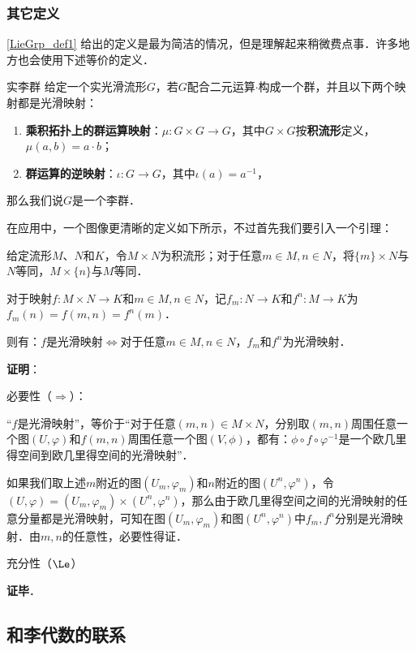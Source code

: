 \subsubsection{其它定义}

\autoref{LieGrp_def1} 给出的定义是最为简洁的情况，但是理解起来稍微费点事．许多地方也会使用下述等价的定义．

\begin{definition}{实李群}
给定一个实光滑流形$G$，若$G$配合二元运算$\cdot$构成一个群，并且以下两个映射都是光滑映射：
\begin{enumerate}
\item \textbf{乘积拓扑上的群运算映射}：$\mu:G\times G\to G$，其中$G\times G$按\textbf{积流形}定义，$\mu(a,b)=a\cdot b$；
\item \textbf{群运算的逆映射}：$\iota:G\to G$，其中$\iota(a)=a^{-1}$，
\end{enumerate}
那么我们说$G$是一个李群．
\end{definition}

在应用中，一个图像更清晰的定义如下所示，不过首先我们要引入一个引理：

\begin{lemma}{}
给定流形$M$、$N$和$K$，令$M\times N$为积流形；对于任意$m\in M, n\in N$，将$\{m\}\times N$与$N$等同，$M\times \{n\}$与$M$等同．

对于映射$f:M\times N\to K$和$m\in M, n\in N$，记$f_m:N\to K$和$f^n:M\to K$为$f_m(n)=f(m, n)=f^n(m)$．

则有：$f$是光滑映射$\iff$对于任意$m\in M, n\in N$，$f_m$和$f^n$为光滑映射．
\end{lemma}

\textbf{证明}：

必要性（$\Rightarrow$）：

“$f$是光滑映射”，等价于“对于任意$(m, n)\in M\times N$，分别取$(m, n)$周围任意一个图$(U, \varphi)$和$f(m, n)$周围任意一个图$(V, \phi)$，都有：$\phi\circ f\circ\varphi^{-1}$是一个欧几里得空间到欧几里得空间的光滑映射”．

如果我们取上述$m$附近的图$(U_m, \varphi_m)$和$n$附近的图$(U^n, \varphi^n)$，令$(U, \varphi)=(U_m, \varphi_m)\times(U^n, \varphi^n)$，那么由于欧几里得空间之间的光滑映射的任意分量都是光滑映射，可知在图$(U_m, \varphi_m)$和图$(U^n, \varphi^n)$中$f_m, f^n$分别是光滑映射．由$m, n$的任意性，必要性得证．

充分性（$\Le$）

\textbf{证毕}．

\subsection{和李代数的联系}

